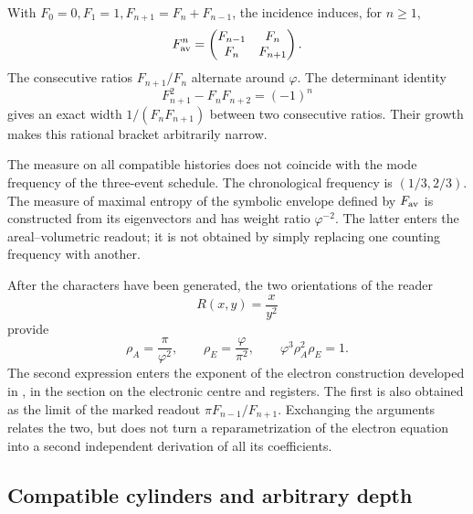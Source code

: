 With \(F_0=0,F_1=1,F_{n+1}=F_n+F_{n-1}\), the incidence induces, for \(n\geq1\),
\[
 F_{\rm av}^n=\begin{pmatrix}F_{n-1}&F_n\\F_n&F_{n+1}\end{pmatrix}.
\]
The consecutive ratios \(F_{n+1}/F_n\) alternate around \(\varphi\). The determinant identity
\[
 F_{n+1}^2-F_nF_{n+2}=(-1)^n
\]
gives an exact width \(1/(F_nF_{n+1})\) between two consecutive ratios. Their growth makes this rational bracket arbitrarily narrow.

The measure on all compatible histories does not coincide with the mode frequency of the three-event schedule. The chronological frequency is \((1/3,2/3)\). The measure of maximal entropy of the symbolic envelope defined by \(F_{\rm av}\) is constructed from its eigenvectors and has weight ratio \(\varphi^{-2}\). The latter enters the areal--volumetric readout; it is not obtained by simply replacing one counting frequency with another.



After the characters have been generated, the two orientations of the reader
\[
 R(x,y)=\frac{x}{y^2}
\]
provide
\begin{equation}
 \rho_A=\frac\pi{\varphi^2},\qquad
 \rho_E=\frac\varphi{\pi^2},\qquad
 \varphi^3\rho_A^2\rho_E=1.
 \label{eq:areal-electron}
\end{equation}
The second expression enters the exponent of the electron construction developed in \cite{hmtX}, in the section on the electronic centre and registers. The first is also obtained as the limit of the marked readout \(\pi F_{n-1}/F_{n+1}\). Exchanging the arguments relates the two, but does not turn a reparametrization of the electron equation into a second independent derivation of all its coefficients.



\subsection{Compatible cylinders and arbitrary depth}

